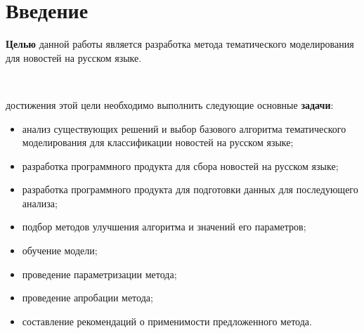 \chapter{Введение}

\noindent\textbf{Целью} данной работы является разработка метода тематического моделирования для новостей на русском языке.

~\

 достижения этой цели необходимо выполнить следующие основные \textbf{задачи}:

\begin{itemize}
    \item анализ существующих решений и выбор базового алгоритма тематического моделирования для классификации новостей на русском языке;
    \item разработка программного продукта для сбора новостей на русском языке;
    \item разработка программного продукта для подготовки данных для последующего анализа;
    \item подбор методов улучшения алгоритма и значений его параметров;
    \item обучение модели;
    \item проведение параметризации метода;
    \item проведение апробации метода;
    \item составление рекомендаций о применимости предложенного метода.
\end{itemize}


